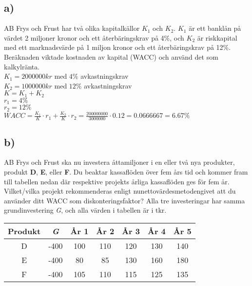 \documentclass[a4paper, titlepage,12pt]{article}
\begin{document}
		\subsection*{a)} AB Frys och Frust har två olika kapitalkällor $K_1$ och $K_2$. $K_1$ är ett banklån på värdet 2 miljoner kronor och ett återbäringskrav på 4\%, och $K_2$ är riskkapital med ett marknadsvärde på 1 miljon kronor och ett återbäringskrav på 12\%. Beräknaden viktade kostnaden av kapital (WACC) och använd det som kalkylränta.\\

$K_1 = 2 000 000kr$ med $4\%$ avkastningskrav\\

$K_2 = 1 000 000kr$ med $12\%$ avkastningskrav\\

$K = K_1 + K_2$\\

$r_1 = 4\%$\\

$r_2 = 12\%$\\

$WACC = \frac{K_1}{K} \cdot r_1 + \frac{K_2}{K} \cdot r_2 = \frac{200000000}{3000000} \cdot 0.12 = 0.0666667 = 6.67\%$\\

		\subsection*{b)} AB Frys och Frust ska nu investera åttamiljoner i en eller två nya produkter, produkt \textbf{D}, \textbf{E}, eller \textbf{F}. Du beaktar kassaflöden över fem års tid och kommer fram till tabellen nedan där respektive projekts årliga kassaflöden ges för fem år. Vilket/vilka projekt rekommenderas enligt nunettovärdesmetodengivet att du använder ditt WACC som diskonteringsfaktor? Alla tre investeringar har samma grundinvestering \emph{G}, och alla värden i tabellen är i tkr.
			\begin{center}
				\begin{tabular}{|c|c|c|c|c|c|c|}
					\hline
					Produkt & \emph{G} & År 1 & År 2 & År 3 & År 4 & År 5 \\
					\hline
					D & -400 & 100 & 110 & 120 & 130 & 140 \\
					\hline
					E & -400 & 80 & 85 & 130 & 160 & 180 \\
					\hline
					F & -400 & 105 & 110 & 115 & 125 & 135 \\
					\hline
				\end{tabular}
			\end{center}
\end{document}
